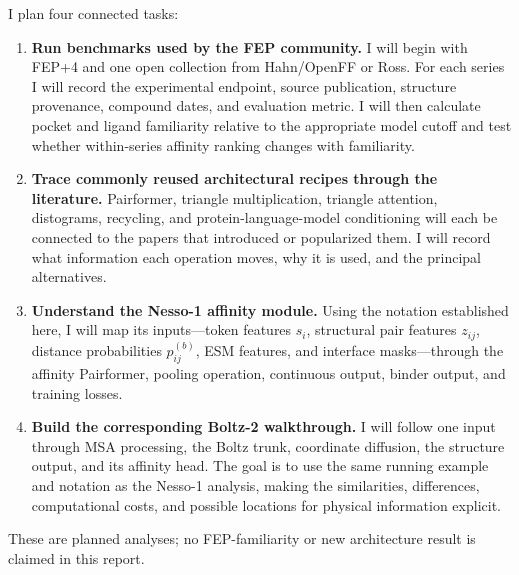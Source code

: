 \documentclass[11pt]{article}
\begin{document}
I plan four connected tasks:

\begin{enumerate}
  \item \textbf{Run benchmarks used by the FEP community.} I will begin with
  FEP+4 and one open collection from Hahn/OpenFF or Ross. For each series I
  will record the experimental endpoint, source publication, structure
  provenance, compound dates, and evaluation metric. I will then calculate
  pocket and ligand familiarity relative to the appropriate model cutoff and
  test whether within-series affinity ranking changes with familiarity.

  \item \textbf{Trace commonly reused architectural recipes through the
  literature.} Pairformer, triangle multiplication, triangle attention,
  distograms, recycling, and protein-language-model conditioning will each be
  connected to the papers that introduced or popularized them. I will record
  what information each operation moves, why it is used, and the principal
  alternatives.

  \item \textbf{Understand the Nesso-1 affinity module.} Using the notation
  established here, I will map its inputs---token features $s_i$, structural
  pair features $z_{ij}$, distance probabilities $p_{ij}^{(b)}$, ESM features,
  and interface masks---through the affinity Pairformer, pooling operation,
  continuous output, binder output, and training losses.

  \item \textbf{Build the corresponding Boltz-2 walkthrough.} I will follow
  one input through MSA processing, the Boltz trunk, coordinate diffusion, the
  structure output, and its affinity head. The goal is to use the same running
  example and notation as the Nesso-1 analysis, making the similarities,
  differences, computational costs, and possible locations for physical
  information explicit.
\end{enumerate}

These are planned analyses; no FEP-familiarity or new architecture result is
claimed in this report.



\end{document}

